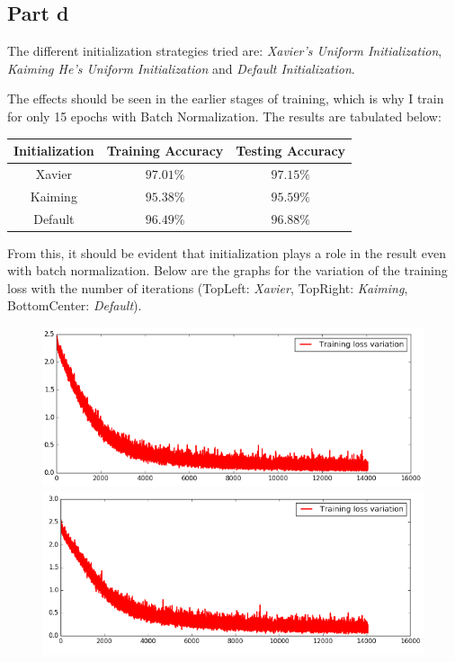 \documentclass{article}
\begin{document}
\subsection*{Part d}
\begin{flushleft}
The different initialization strategies tried are: \emph{Xavier's Uniform Initialization}, \emph{Kaiming He's Uniform Initialization} and \emph{Default Initialization}.

The effects should be seen in the earlier stages of training, which is why I train for only 15 epochs with Batch Normalization. The results are tabulated below:
\begin{center}
\begin{tabular}{|c|c|c|}
\hline
Initialization & Training Accuracy & Testing Accuracy \\
\hline
\hline
Xavier & \(\mathbf{97.01}\%\) & \(\mathbf{97.15}\%\)\\
\hline
Kaiming & \(95.38\%\) & \(95.59\%\)\\
\hline
Default & \(96.49\%\) & \(96.88\%\)\\
\hline
\end{tabular}
\end{center}

From this, it should be evident that initialization plays a role in the result even with batch normalization. Below are the graphs for the variation of the training loss with the number of iterations (TopLeft: \emph{Xavier}, TopRight: \emph{Kaiming}, BottomCenter: \emph{Default}).
\begin{figure}[H]
\begin{minipage}{0.49\linewidth}
\centering
\includegraphics[width=\textwidth]{xavier_init.png}
\end{minipage}
\hfill
\begin{minipage}{0.49\linewidth}
\centering
\includegraphics[width=\textwidth]{kaiming_init.png}
\end{minipage}
\end{figure}


\end{flushleft}
\end{document}
